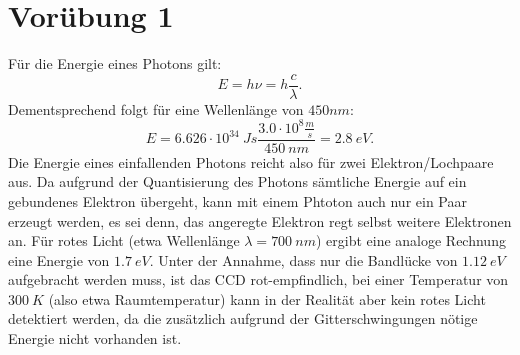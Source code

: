 \documentclass[titlepage]{scrartcl}
\begin{document}
\section{Vorübung 1}
Für die Energie eines Photons gilt: 
\begin{equation}
E = h \nu = h \frac{c}{\lambda}. 
\end{equation}
Dementsprechend folgt für eine Wellenlänge von $450 nm$: 
\begin{equation}
E = 6.626 \cdot 10^{34}\ Js \frac{3.0 \cdot 10^8 \frac{m}{s}}{450\ nm} = 2.8\ eV. 
\end{equation}
Die Energie eines einfallenden Photons reicht also für zwei Elektron/Lochpaare aus. 	Da aufgrund der Quantisierung des Photons sämtliche Energie auf ein gebundenes Elektron übergeht, kann mit einem Phtoton auch nur ein Paar erzeugt werden, es sei denn, das angeregte Elektron regt selbst weitere Elektronen an.  
Für rotes Licht (etwa Wellenlänge $\lambda = 700\ nm $) ergibt eine analoge Rechnung eine Energie von $1.7\ eV $. Unter der Annahme, dass nur die Bandlücke von $1.12\ eV $ aufgebracht werden muss, ist das CCD rot-empfindlich, bei einer Temperatur von $ 300\ K $ (also etwa Raumtemperatur) kann in der Realität aber kein rotes Licht detektiert werden, da die zusätzlich aufgrund der Gitterschwingungen nötige Energie nicht vorhanden ist. 
\end{document}
